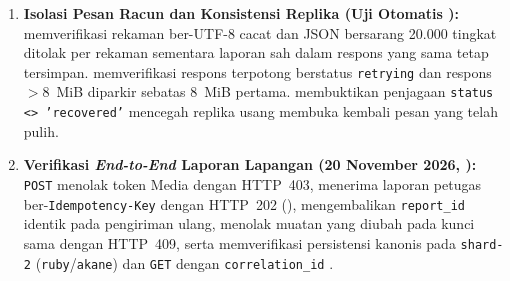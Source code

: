 \begin{enumerate}
    \item \textbf{Isolasi Pesan Racun dan Konsistensi Replika (Uji Otomatis ):}  memverifikasi rekaman ber-UTF-8 cacat dan JSON bersarang 20.000 tingkat ditolak per rekaman sementara laporan sah dalam respons yang sama tetap tersimpan.  memverifikasi respons terpotong berstatus \texttt{retrying} dan respons $>8$~MiB diparkir sebatas 8~MiB pertama.  membuktikan penjagaan \texttt{status <> 'recovered'} mencegah replika usang membuka kembali pesan yang telah pulih.
    \item \textbf{Verifikasi \textit{End-to-End} Laporan Lapangan (20 November 2026, ):} \texttt{POST}  menolak token Media dengan HTTP~403, menerima laporan petugas ber-\texttt{Idempotency-Key} dengan HTTP~202 (), mengembalikan \texttt{report\_id} identik pada pengiriman ulang, menolak muatan yang diubah pada kunci sama dengan HTTP~409, serta memverifikasi persistensi kanonis pada \texttt{shard-2} (\texttt{ruby}/\texttt{akane}) dan \texttt{GET}  dengan \texttt{correlation\_id} .
\end{enumerate}

\vspace{1em}

